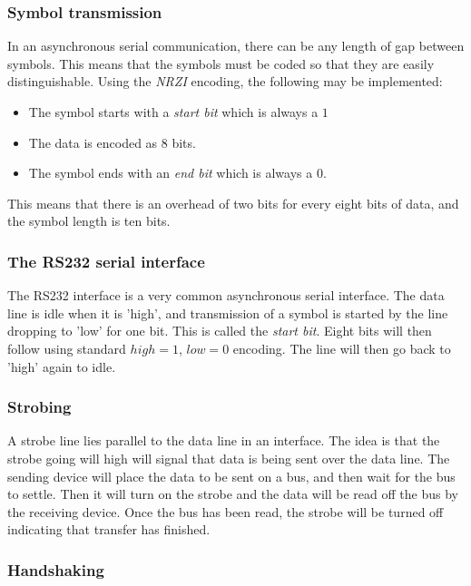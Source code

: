 \subsubsection{Symbol transmission}

In an asynchronous serial communication, there can be any length of gap between
symbols. This means that the symbols must be coded so that they are easily
distinguishable. Using the {\it NRZI} encoding, the following may be
implemented:

\begin{itemize}
	\item The symbol starts with a {\it start bit} which is always a $1$
	\item The data is encoded as 8 bits.
	\item The symbol ends with an {\it end bit} which is always a $0$.
\end{itemize}

This means that there is an overhead of two bits for every eight bits of data,
and the symbol length is ten bits.

\subsubsection{The RS232 serial interface}

The RS232 interface is a very common asynchronous serial interface. The data
line is idle when it is 'high', and transmission of a symbol is started by the
line dropping to 'low' for one bit. This is called the {\it start bit}. Eight
bits will then follow using standard $high=1$, $low=0$ encoding. The line will
then go back to 'high' again to idle.

\subsubsection{Strobing}

A strobe line lies parallel to the data line in an interface. The idea is that
the strobe going will high will signal that data is being sent over the data
line. The sending device will place the data to be sent on a bus, and then wait
for the bus to settle. Then it will turn on the strobe and the data will be read
off the bus by the receiving device. Once the bus has been read, the strobe will
be turned off indicating that transfer has finished.

\subsubsection{Handshaking}

